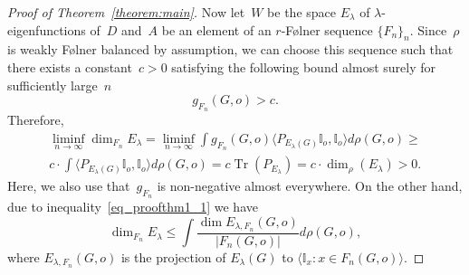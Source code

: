 \documentclass[english]{article}
\theoremstyle{definition}
\DeclareMathOperator{\Tr}{Tr} %
\begin{document}
\begin{proof}[Proof of Theorem~\ref{theorem:main}]
    Now let~$W$ be the space $E_\lambda$ of $\lambda$-eigenfunctions of~$D$ and~$A$ be an element of an $r$-F\o lner sequence $\{F_n\}_n$.
    Since~$\rho$ is weakly {F\o lner} balanced by assumption, we can choose this sequence such that there exists a constant~$c > 0$ satisfying the following bound almost surely for sufficiently large~$n$
    \begin{equation}\label{eq_proof1}
        g_{F_n}(G,o) > c.
    \end{equation}
    Therefore,
    \begin{multline}\label{eq_proof2}
        \liminf_{n \to \infty} \dim_{F_n} E_\lambda = 
        \liminf_{n \to \infty} \int g_{F_n}(G,o) \langle P_{E_\lambda(G)}\mathbb I_o, \mathbb I_o\rangle d \rho(G,o) \ge \\
        c \cdot \int \langle P_{E_\lambda(G)}\mathbb I_o, \mathbb I_o\rangle d \rho(G,o) = c \Tr(P_{E_\lambda}) = c \cdot \dim_\rho (E_\lambda) > 0.
    \end{multline}
    Here, we also use that~$g_{F_n}$ is non-negative almost everywhere. On the other hand, due to inequality~\eqref{eq_proofthm1_1} we have 
    \begin{equation}\label{eq_finproj}
        \dim_{F_n} E_\lambda \le 
        \int \frac{\dim {E_{\lambda,F_n}}(G,o)}{|F_n(G,o)|} d \rho (G,o),
    \end{equation}
    where $E_{\lambda, F_n}(G,o)$ is the projection of $E_\lambda(G)$ to $\langle \mathbb I_x \colon x\in F_n(G,o)\rangle$. 


\end{proof}
\end{document}
